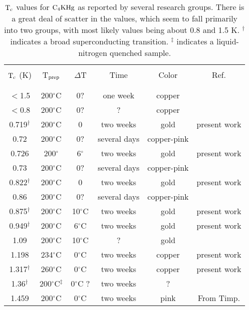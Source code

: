 \begin{table}
\caption[$\rm T_c$ values reported for $\rm C_4KHg$.]{$\rm T_c$
values for  $\rm C_4KHg$ as reported by several research
groups.  There is a great deal of scatter in the values, which seem to fall
primarily 
into two groups, with most likely values being about 0.8 and 1.5 K.
$^{\dagger}$ indicates a broad superconducting transition.  $^{\ddagger}$
indicates a liquid-nitrogen quenched sample.\cite{delong82a}}
\label{stitc}
\begin{center}
\begin{tabular}{||c|c|c|c|c|c||}
\hline
& & & & & \\
$\rm T_c$ (K) & T$\rm _{prep}$ & $\Delta$T & Time & Color & Ref.\\
& & & & & \\
\hline
& & & & & \\
$<$1.5 & 200$^{\circ}$C  & 0?  & one week & copper & \cite{koike81}\\
$<$0.8 & 200$^{\circ}$C  & 0? & ?  &  copper & \cite{alexander81}\\
0.719$^{\dagger}$ & 200$^{\circ}$C  & 0 & two weeks & gold& present work\\	%
0.72 & 200$^{\circ}$C & 0? & several days & copper-pink & \cite{iye82}\\
0.726 & 200$^{\circ}$  & 6$^{\circ}$ & two weeks &gold & present work\\   %
0.73 & 200$^{\circ}$C & 0? & several days & copper-pink & \cite{iye82}\\
0.822$^{\dagger}$ & 200$^{\circ}$C & 0 & two weeks & gold & present work\\	%
0.86 & 200$^{\circ}$C & 0?  & several days & copper-pink & \cite{iye82}\\
0.875$^{\dagger}$ & 200$^{\circ}$C  & 10$^{\circ}$C  & two weeks & gold & present work \\	%
0.949$^{\dagger}$ & 200$^{\circ}$C  & 6$^{\circ}$C  & two weeks & gold & present work \\ %
1.09 & 200$^{\circ}$C & 10$^{\circ}$C & ? & gold & \cite{J140}\\
1.198 &234$^{\circ}$C   & 0$^{\circ}$C  & two weeks & copper & present work\\	%
1.317$^{\dagger}$ &260$^{\circ}$C  & 0$^{\circ}$C   & two weeks& copper & present work\\	%
1.36$^{\dagger}$ & 200$^{\circ}$C$^{\ddagger}$ & 0$^{\circ}$C ? & two weeks
& ? & \cite{delong82} \\
1.459 &200$^{\circ}$C & 0$^{\circ}$C & two weeks &pink & From Timp. \\	%

\end{tabular}
\end{center}
\end{table}
